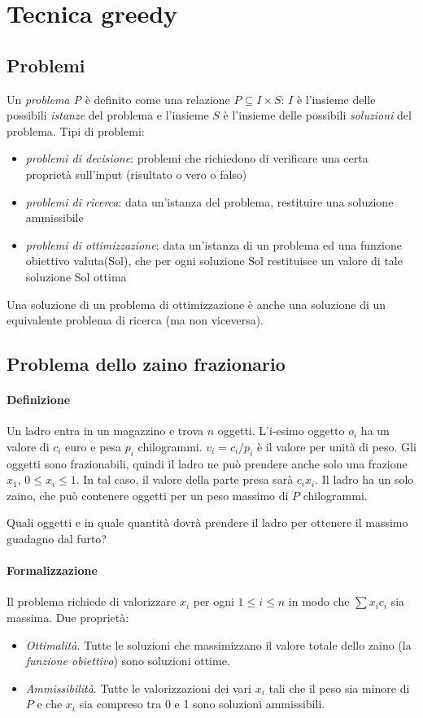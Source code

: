 \documentclass[11pt]{book}
\begin{document}
\chapter{Tecnica greedy}
\section{Problemi}
Un \textit{problema P} è definito come una relazione $P\subseteq I\times S$: $I$ è l'insieme delle possibili \textit{istanze}
del problema e l'insieme $S$ è l'insieme delle possibili \textit{soluzioni} del problema.
Tipi di problemi:
\begin{itemize}
    \item \textit{problemi di decisione}: problemi che richiedono di verificare una certa proprietà sull'input (risultato 
    o vero o falso)
    \item \textit{problemi di ricerca}: data un'istanza del problema, restituire una soluzione ammissibile
    \item \textit{problemi di ottimizzazione}: data un'istanza di un problema ed una funzione obiettivo valuta(Sol), che per 
    ogni soluzione Sol restituisce un valore di tale soluzione Sol ottima
\end{itemize}
Una soluzione di un problema di ottimizzazione è anche una soluzione di un equivalente problema di ricerca (ma non viceversa).
\section{Problema dello zaino frazionario}
\subsubsection{Definizione}
Un ladro entra in un magazzino e trova $n$ oggetti. L'i-esimo oggetto $o_i$ ha un valore di $c_i$ euro e pesa $p_i$ chilogrammi.
$v_i=c_i/p_i$ è il valore per unità di peso. Gli oggetti sono frazionabili, quindi il ladro ne può prendere anche solo una 
frazione $x_1$, $0\leq x_i \leq 1$. In tal caso, il valore della parte presa sarà $c_ix_i$. Il ladro ha un solo zaino, che 
può contenere oggetti per un peso massimo di $P$ chilogrammi.

Quali oggetti e in quale quantità dovrà prendere il ladro per ottenere il massimo guadagno dal furto?
\subsubsection{Formalizzazione}
Il problema richiede di valorizzare $x_i$ per ogni $1\leq i \leq n$ in modo che $\sum x_ic_i$ sia massima. Due proprietà: 
\begin{itemize}
    \item \textit{Ottimalità}. Tutte le soluzioni che massimizzano il valore totale dello zaino (la \textit{funzione obiettivo}) 
    sono soluzioni ottime. 
    \item \textit{Ammissibilità}. Tutte le valorizzazioni dei vari $x_i$ tali che il peso sia minore di $P$ e che $x_i$ 
    sia compreso tra 0 e 1 sono soluzioni ammissibili.
\end{itemize}
\end{document}
